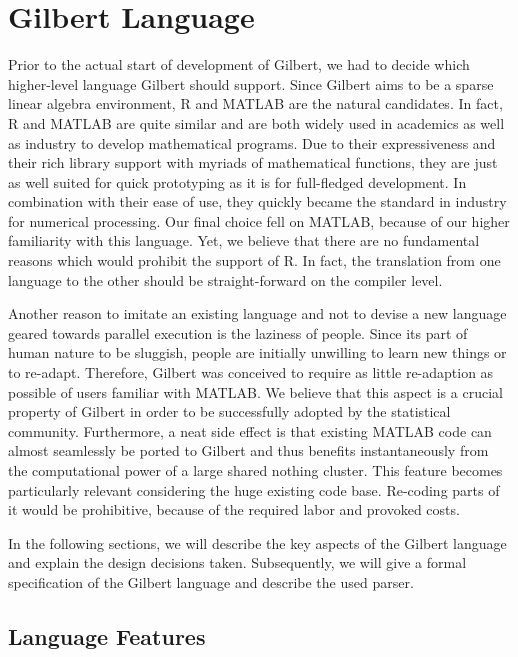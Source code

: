 \section{Gilbert Language}
\label{cha:gilbertlanguage}

Prior to the actual start of development of Gilbert, we had to decide which higher-level language Gilbert should support.
Since Gilbert aims to be a sparse linear algebra environment, R and MATLAB are the natural candidates.
In fact, R and MATLAB are quite similar and are both widely used in academics as well as industry to develop mathematical programs.
Due to their expressiveness and their rich library support with myriads of mathematical functions, they are just as well suited for quick prototyping as it is for full-fledged development.
In combination with their ease of use, they quickly became the standard in industry for numerical processing.
Our final choice fell on MATLAB, because of our higher familiarity with this language.
Yet, we believe that there are no fundamental reasons which would prohibit the support of R.
In fact, the translation from one language to the other should be straight-forward on the compiler level.

Another reason to imitate an existing language and not to devise a new language geared towards parallel execution is the laziness of people.
Since its part of human nature to be sluggish, people are initially unwilling to learn new things or to re-adapt.
Therefore, Gilbert was conceived to require as little re-adaption as possible of users familiar with MATLAB.
We believe that this aspect is a crucial property of Gilbert in order to be successfully adopted by the statistical community.
Furthermore, a neat side effect is that existing MATLAB code can almost seamlessly be ported to Gilbert and thus benefits instantaneously from the computational power of a large shared nothing cluster.
This feature becomes particularly relevant considering the huge existing code base.
Re-coding parts of it would be prohibitive, because of the required labor and provoked costs.

In the following sections, we will describe the key aspects of the Gilbert language and explain the design decisions taken.
Subsequently, we will give a formal specification of the Gilbert language and describe the used parser.

\subsection{Language Features}
\label{sec:languageFeatures}

